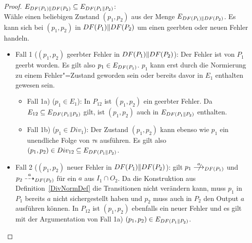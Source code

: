 \begin{proof}
  $E_{DF (P_1)\| DF (P_2)} \subseteq E_{DF (P_1\|P_2)}$:\\
  Wähle einen beliebigen Zustand $(p_1,p_2)$ aus der Menge $E_{DF (P_1)\| DF
  (P_2)}$. Es kann sich bei $(p_1,p_2)$ in $DF (P_1)\| DF (P_2)$ um einen
  geerbten oder neuen Fehler handeln.
  \begin{itemize}
    \item Fall 1 ($(p_1,p_2)$ geerbter Fehler in $DF (P_1)\| DF (P_2)$): Der
      Fehler ist \oBdA{} von $P_1$ geerbt worden. Es gilt also $p_1\in E_{DF
      (P_1)}$. $p_1$ kann erst durch die Normierung zu einem Fehler"=Zustand
      geworden sein oder bereits davor in $E_1$ enthalten gewesen sein.
      \begin{itemize}
        \item Fall 1a) ($p_1\in E_1$): In $P_{12}$ ist $(p_1,p_2)$ ein geerbter
          Fehler. Da $E_{12}\subseteq E_{DF (P_1\|P_2)}$ gilt, ist $(p_1,p_2)$
          auch in $E_{DF (P_1\|P_2)}$ enthalten.
        \item Fall 1b) ($p_1\in Div_1$): Der Zustand $(p_1,p_2)$ kann ebenso
          wie $p_1$ ein unendliche Folge von $\tau$s ausführen. Es gilt also
          $(p_1,p_2)\in Div_{12}\subseteq E_{DF (P_1\|P_2)}$.
      \end{itemize}
    \item Fall 2 ($(p_1,p_2)$ neuer Fehler in $DF (P_1)\| DF (P_2)$): \OBdA{}
      gilt $p_1\nmust[a]_{\DF (P_1)}$ und $p_2\may[a]_{\DF (P_2)}$ für ein $a$
      aus $I_1\cap O_2$. Da die Konstruktion aus Definition~\ref{DivNormDef}
      die Transitionen nicht verändern kann, muss $p_1$ in $P_1$ bereits $a$
      nicht sichergestellt haben und $p_2$ muss auch in $P_2$ den Output $a$
      ausführen können. In $P_{12}$ ist $(p_1,p_2)$ ebenfalls ein neuer Fehler
      und es gilt mit der Argumentation von Fall 1a) $(p_1,p_2)\in E_{DF
      (P_1\|P_2)}$.
  \end{itemize}
\end{proof}

